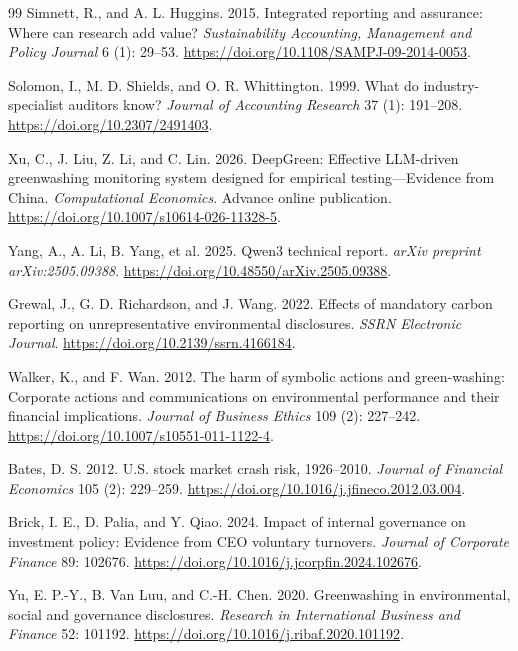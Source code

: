 \documentclass[11pt]{article}
\begin{document}
\begin{thebibliography}{99}
Simnett, R., and A. L. Huggins. 2015.
Integrated reporting and assurance: Where can research add value?
\textit{Sustainability Accounting, Management and Policy Journal} 6 (1): 29--53. \url{https://doi.org/10.1108/SAMPJ-09-2014-0053}.

Solomon, I., M. D. Shields, and O. R. Whittington. 1999.
What do industry-specialist auditors know?
\textit{Journal of Accounting Research} 37 (1): 191--208. \url{https://doi.org/10.2307/2491403}.

Xu, C., J. Liu, Z. Li, and C. Lin. 2026.
DeepGreen: Effective LLM-driven greenwashing monitoring system designed for empirical testing---Evidence from China.
\textit{Computational Economics}. Advance online publication. \url{https://doi.org/10.1007/s10614-026-11328-5}.

Yang, A., A. Li, B. Yang, et al. 2025.
Qwen3 technical report.
\textit{arXiv preprint arXiv:2505.09388}. \url{https://doi.org/10.48550/arXiv.2505.09388}.

Grewal, J., G. D. Richardson, and J. Wang. 2022.
Effects of mandatory carbon reporting on unrepresentative environmental disclosures.
\textit{SSRN Electronic Journal}. \url{https://doi.org/10.2139/ssrn.4166184}.

Walker, K., and F. Wan. 2012.
The harm of symbolic actions and green-washing: Corporate actions and communications on environmental performance and their financial implications.
\textit{Journal of Business Ethics} 109 (2): 227--242. \url{https://doi.org/10.1007/s10551-011-1122-4}.

Bates, D. S. 2012.
U.S. stock market crash risk, 1926--2010.
\textit{Journal of Financial Economics} 105 (2): 229--259. \url{https://doi.org/10.1016/j.jfineco.2012.03.004}.

Brick, I. E., D. Palia, and Y. Qiao. 2024.
Impact of internal governance on investment policy: Evidence from CEO voluntary turnovers.
\textit{Journal of Corporate Finance} 89: 102676. \url{https://doi.org/10.1016/j.jcorpfin.2024.102676}.

Yu, E. P.-Y., B. Van Luu, and C.-H. Chen. 2020.
Greenwashing in environmental, social and governance disclosures.
\textit{Research in International Business and Finance} 52: 101192. \url{https://doi.org/10.1016/j.ribaf.2020.101192}.


\end{thebibliography}
\end{document}
